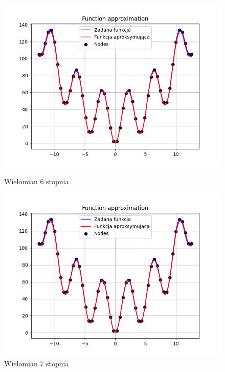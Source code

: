 \documentclass{article}
\begin{document}
\begin{figure}[H]
  \begin{minipage}[b]{0.49\textwidth}
    \begin{minipage}[b]{\textwidth}
      \includegraphics[width=\textwidth]{img24.png}
      \caption{Wielomian 6 stopnia}
    \end{minipage}
    \vspace*{\fill}
    \begin{minipage}[b]{\textwidth}
      \includegraphics[width=\textwidth]{img25.png}
      \caption{Wielomian 7 stopnia}
    \end{minipage}
  \end{minipage}
  \hfill
  \begin{minipage}[b]{0.49\textwidth}

\end{minipage}
\end{figure}
\end{document}
